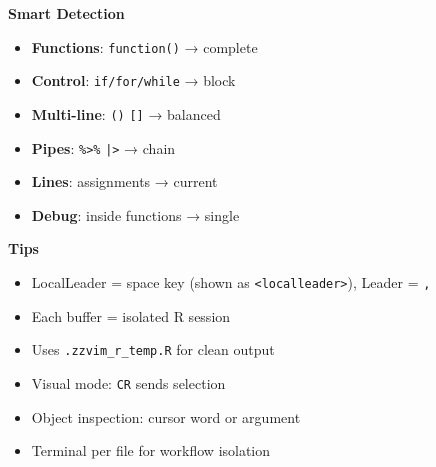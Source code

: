 \documentclass[10pt,a4paper]{article}
\begin{document}
\begin{multicols}{3}
\columnbreak

\textbf{Smart Detection}
\begin{itemize}
\item \textbf{Functions}: \texttt{function()} → complete
\item \textbf{Control}: \texttt{if/for/while} → block  
\item \textbf{Multi-line}: \texttt{()} \texttt{[]} → balanced
\item \textbf{Pipes}: \texttt{\%>\%} \texttt{|>} → chain
\item \textbf{Lines}: assignments → current
\item \textbf{Debug}: inside functions → single
\end{itemize}

\vspace{4pt}
\textbf{Tips}
\begin{itemize}
\item LocalLeader = space key (shown as \texttt{<localleader>}), Leader = \texttt{,}
\item Each buffer = isolated R session
\item Uses \texttt{.zzvim\_r\_temp.R} for clean output
\item Visual mode: \texttt{CR} sends selection
\item Object inspection: cursor word or argument
\item Terminal per file for workflow isolation
\end{itemize}

\end{multicols}
\end{document}
